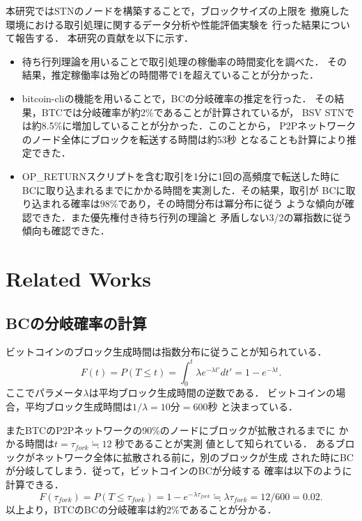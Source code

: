 \documentclass[graybox]{svmult}
\begin{document}
本研究ではSTNのノードを構築することで，ブロックサイズの上限を
撤廃した環境における取引処理に関するデータ分析や性能評価実験を
行った結果について報告する．
本研究の貢献を以下に示す．
%
\begin{itemize}
  \item 待ち行列理論を用いることで取引処理の稼働率の時間変化を調べた．
	その結果，推定稼働率は殆どの時間帯で1を超えていることが分かった．
  \item bitcoin-cliの機能を用いることで，BCの分岐確率の推定を行った．
	その結果，BTCでは分岐確率が約2\%であることが計算されているが，
	BSV STNでは約8.5\%に増加していることが分かった．このことから，
	P2Pネットワークのノード全体にブロックを転送する時間は約53秒
	となることも計算により推定できた．
  \item OP\_RETURNスクリプトを含む取引を1分に1回の高頻度で転送した時に
	BCに取り込まれるまでにかかる時間を実測した．その結果，取引が
        BCに取り込まれる確率は98\%であり，その時間分布は冪分布に従う
	ような傾向が確認できた．また優先権付き待ち行列の理論と
	矛盾しない3/2の冪指数に従う傾向も確認できた．
\end{itemize}
%




\section{Related Works}
\label{sec:rworks}

\subsection{BCの分岐確率の計算}
\label{sec:fork}

ビットコインのブロック生成時間は指数分布に従うことが知られている．
%
\begin{equation}
	F(t) = P(T \le t) = \int_{0}^{t} \lambda e^{-\lambda t'} dt' = 1 - e^{-\lambda t}. \label{eq:exp}
\end{equation}
%
ここでパラメータ$\lambda$は平均ブロック生成時間の逆数である．
ビットコインの場合，平均ブロック生成時間は$1/\lambda=10$分$=600$秒
と決まっている．

またBTCのP2Pネットワークの90\%のノードにブロックが拡散されるまでに
かかる時間は$t = \tau_{fork} \fallingdotseq 12$ 秒であることが実測
値として知られている\cite{bloX}．
あるブロックがネットワーク全体に拡散される前に，別のブロックが生成
された時にBCが分岐してしまう．従って，ビットコインのBCが分岐する
確率は以下のように計算できる．
%
\begin{equation}
  F(\tau_{fork}) = P(T \le \tau_{fork}) = 1 - e^{-\lambda \tau_{fork}} \fallingdotseq \lambda \tau_{fork} = 12/600 = 0.02. 
\end{equation}
%
以上より，BTCのBCの分岐確率は約2\%であることが分かる．
\end{document}
